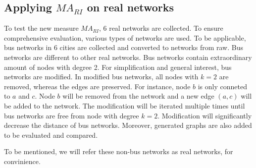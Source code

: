 \documentclass[12pt]{article}
\begin{document}
\subsection{Applying $MA_{RI}$ on real networks}
To test the new measure $MA_{RI}$, 6 real networks are collected. To ensure comprehensive evaluation, various types of networks are used. To be applicable, bus networks in 6 cities are collected and converted to networks from raw. Bus networks are different to other real networks. Bus networks contain extraordinary amount of nodes with degree 2. For simplification and general interest, bus networks are modified. In modified bus networks, all nodes with $k=2$ are removed, whereas the edges are preserved. For instance, node $b$ is only conneted to $a$ and $c$. Node $b$ will be removed from the network and a new edge $(a,c)$ will be added to the network. The modification will be iterated multiple times until bus networks are free from node with degree $k=2$. Modification will significantly decrease the distance of bus networks. Moreover, generated graphs are also added to be evaluated and compared.\par
To be mentioned, we will refer these non-bus networks as real networks, for convinience.
\end{document}
